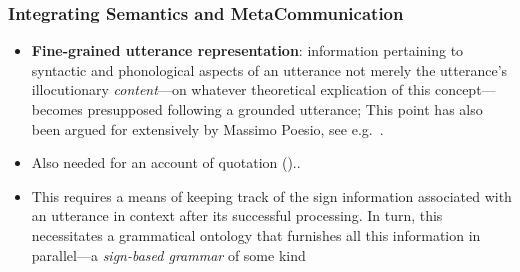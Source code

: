 \documentclass{beamer}
\begin{document}
\begin{frame}
\frametitle{Integrating Semantics and MetaCommunication }

\begin{itemize}

\item {\bf Fine-grained utterance representation}: information
  pertaining to syntactic and phonological aspects of an utterance
not merely the utterance's illocutionary
  {\it content}---on whatever theoretical explication of this
  concept---becomes  presupposed following a grounded
  utterance; This point has also been argued for extensively
    by Massimo Poesio, see
    e.g.\ \cite{potr97,poesio-rieser09}.
\item Also needed for an account of quotation (\cite{gc-quot12})..

\item  This requires a
means of keeping track of the sign information associated with an utterance
  in context after its successful processing. In turn, this necessitates a
  grammatical ontology that furnishes all this information in
  parallel---a {\it sign-based grammar} of some kind 


\end{itemize}

\end{frame}
\end{document}
